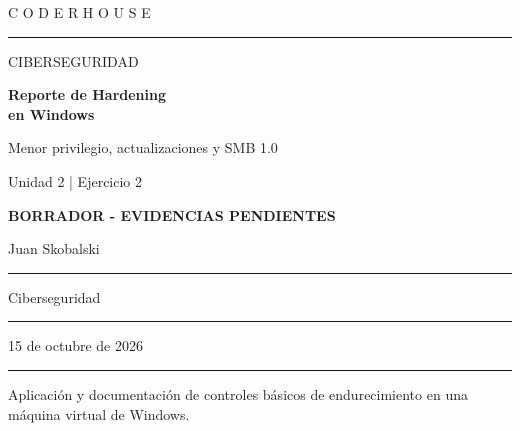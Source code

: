 \documentclass[11pt,a4paper]{article}
\newif\ifreportcomplete
\begin{document}
\thispagestyle{empty}
\vspace*{1.0cm}
{\color{turquesa}\large C O D E R H O U S E}\par
\vspace{0.4cm}
{\color{linea}\rule{\textwidth}{1.2pt}}\par
\vspace{2.3cm}
{\color{gris}\Large CIBERSEGURIDAD}\par
\vspace{0.45cm}
{\color{azul}\Huge\bfseries Reporte de Hardening\\[5pt] en Windows}\par
\vspace{0.45cm}
{\color{turquesa}\LARGE Menor privilegio, actualizaciones y SMB 1.0}\par
\vspace{1.0cm}
{\color{gris}\large Unidad 2 | Ejercicio 2}\par

\vspace{0.8cm}
\ifreportcomplete
  \colorbox{fondo}{\parbox{\dimexpr\textwidth-2\fboxsep}{\centering\color{turquesa}\textbf{REPORTE CON EVIDENCIAS COMPLETAS}}}
\else
  \colorbox{fondo}{\parbox{\dimexpr\textwidth-2\fboxsep}{\centering\color{pendiente}\textbf{BORRADOR - EVIDENCIAS PENDIENTES}}}
\fi

\vfill
\noindent\colorbox{fondo}{%
  \begin{minipage}{\dimexpr\textwidth-2\fboxsep}
    \vspace{0.28cm}
    \noindent{}Juan Skobalski\par
    \vspace{0.18cm}\color{linea}\hrule\color{black}\vspace{0.18cm}
    \noindent{}Ciberseguridad\par
    \vspace{0.18cm}\color{linea}\hrule\color{black}\vspace{0.18cm}
    \noindent{}15 de octubre de 2026\par
    \vspace{0.28cm}
  \end{minipage}}
\vspace{0.75cm}
{\color{linea}\rule{\textwidth}{1.2pt}}\par
\vspace{0.25cm}
{\small\color{gris}Aplicación y documentación de controles básicos de endurecimiento en una máquina virtual de Windows.}
\end{document}
